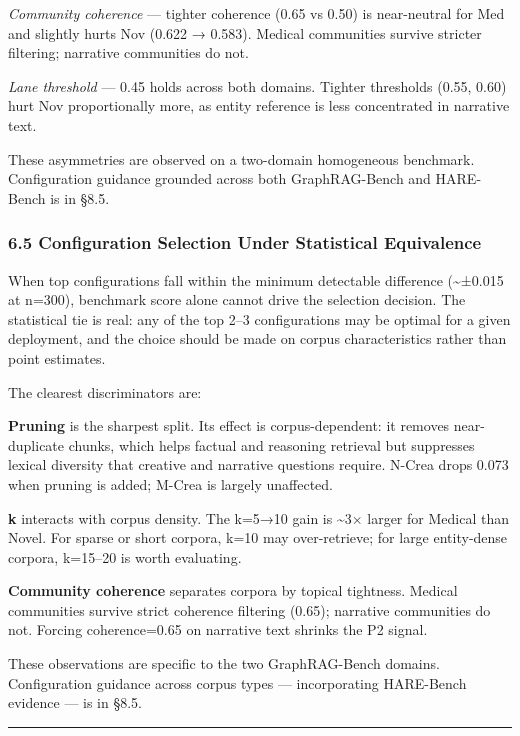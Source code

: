 \emph{Community coherence} --- tighter coherence (0.65 vs 0.50) is near-neutral for Med and slightly hurts Nov (0.622 → 0.583). Medical communities survive stricter filtering; narrative communities do not.

\emph{Lane threshold} --- 0.45 holds across both domains. Tighter thresholds (0.55, 0.60) hurt Nov proportionally more, as entity reference is less concentrated in narrative text.

These asymmetries are observed on a two-domain homogeneous benchmark. Configuration guidance grounded across both GraphRAG-Bench and HARE-Bench is in §8.5.

\subsubsection{6.5 Configuration Selection Under Statistical Equivalence}\label{configuration-selection-under-statistical-equivalence}

When top configurations fall within the minimum detectable difference (\textasciitilde±0.015 at n=300), benchmark score alone cannot drive the selection decision. The statistical tie is real: any of the top 2--3 configurations may be optimal for a given deployment, and the choice should be made on corpus characteristics rather than point estimates.

The clearest discriminators are:

\textbf{Pruning} is the sharpest split. Its effect is corpus-dependent: it removes near-duplicate chunks, which helps factual and reasoning retrieval but suppresses lexical diversity that creative and narrative questions require. N-Crea drops 0.073 when pruning is added; M-Crea is largely unaffected.

\textbf{k} interacts with corpus density. The k=5→10 gain is \textasciitilde3× larger for Medical than Novel. For sparse or short corpora, k=10 may over-retrieve; for large entity-dense corpora, k=15--20 is worth evaluating.

\textbf{Community coherence} separates corpora by topical tightness. Medical communities survive strict coherence filtering (0.65); narrative communities do not. Forcing coherence=0.65 on narrative text shrinks the P2 signal.

These observations are specific to the two GraphRAG-Bench domains. Configuration guidance across corpus types --- incorporating HARE-Bench evidence --- is in §8.5.

\begin{center}\rule{0.5\linewidth}{0.5pt}\end{center}


